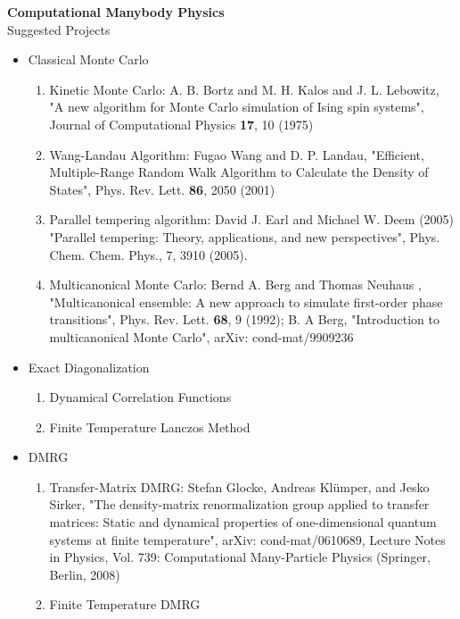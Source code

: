 \documentclass[12pt]{article}
\begin{document}
\begin{center}
\Large
\textbf{Computational Manybody Physics}\\
\large
Suggested Projects
\date{today}
\end{center}
\begin{itemize}
\item Classical Monte Carlo
\begin{enumerate}
\item Kinetic Monte Carlo:
A. B. Bortz and M. H. Kalos and J. L. Lebowitz, "A new algorithm for Monte Carlo simulation of Ising spin systems", Journal of Computational Physics \textbf{17}, 10 (1975) 
\item Wang-Landau Algorithm: Fugao Wang and D. P. Landau, "Efficient, Multiple-Range Random Walk Algorithm to Calculate the Density of States", Phys. Rev. Lett. \textbf{86}, 2050 (2001)
\item Parallel tempering algorithm:  David J. Earl and Michael W. Deem (2005) "Parallel tempering: Theory, applications, and new perspectives", Phys. Chem. Chem. Phys., 7, 3910 (2005).
\item Multicanonical Monte Carlo:    Bernd A. Berg and Thomas Neuhaus , "Multicanonical ensemble: A new approach to simulate first-order phase transitions", Phys. Rev. Lett. \textbf{68}, 9 (1992); B. A Berg, "Introduction to multicanonical Monte Carlo", arXiv: cond-mat/9909236
\end{enumerate}
\item Exact Diagonalization
\begin{enumerate}
\item Dynamical Correlation Functions
\item Finite Temperature Lanczos Method
\end{enumerate}
\item DMRG
\begin{enumerate}
\item Transfer-Matrix DMRG: Stefan Glocke, Andreas Kl\"{u}mper, and Jesko Sirker, "The density-matrix renormalization group applied to transfer matrices: Static and dynamical properties of one-dimensional quantum systems at finite temperature", arXiv: cond-mat/0610689, Lecture Notes in Physics, Vol. 739: Computational Many-Particle Physics (Springer, Berlin, 2008)
\item Finite Temperature DMRG

\end{enumerate}
\end{itemize}
\end{document}
